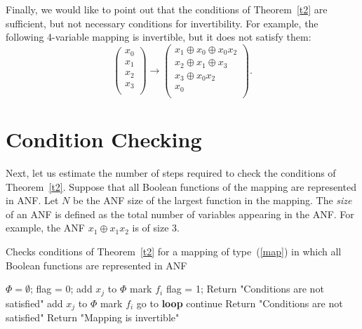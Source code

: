 \documentclass[9pt,conference]{IEEEtran} \usepackage{times}
\begin{document}
Finally, we would like to point out that the conditions of Theorem~\ref{t2} are sufficient, but not necessary conditions for invertibility. For example, the following 4-variable mapping is invertible, but it does not satisfy them:
\[
\left(
\begin{array}{c}
x_0\\
x_1\\
x_2\\
x_3\\
\end{array}
\right)
\rightarrow
\left(
\begin{array}{c}
x_1 \oplus x_0 \oplus x_0 x_2\\
x_2 \oplus x_1 \oplus x_3\\
x_3 \oplus x_0 x_2\\
x_0\\
\end{array}
\right).
\]


\section{Condition Checking} \label{compl}

Next, let us estimate the number of steps required to check the conditions of Theorem~\ref{t2}.
Suppose that all Boolean functions of the mapping are represented in ANF. 
Let $N$ be the ANF size of the largest function in the mapping. 
The {\em size} of an ANF is defined as the total number of variables appearing in the ANF. 
For example, the ANF $x_1 \oplus x_1 x_2$ is of size 3.

\begin{algorithm}[t!]
\caption{\footnotesize{Checks conditions of Theorem~\ref{t2} for a mapping of type~(\ref{map})
in which all Boolean functions are represented in ANF}} \label{alg}
\begin{algorithmic}[1]
\STATE $\Phi = \emptyset$; 
\STATE flag = 0;
\STATE add $x_j$ to $\Phi$ 
\STATE mark $f_i$ 
\STATE flag = 1; 
\ENDIF
\ENDFOR
{} 
\STATE Return "Conditions are not satisfied"
\ENDIF
{} 
\STATE add $x_j$ to $\Phi$ 
\STATE mark $f_i$
\STATE go to {\bf loop}
\ENDIF
\ENDIF
\ENDFOR
{} 
\STATE continue
\ELSE
\STATE Return "Conditions are not satisfied"
\ENDIF
\ENDFOR
\STATE Return "Mapping is invertible"
\end{algorithmic}
\end{algorithm}
\end{document}
